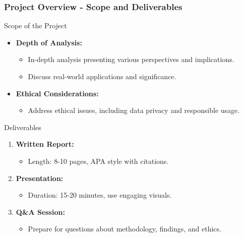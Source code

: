 \documentclass[aspectratio=169]{beamer}
\begin{document}
\begin{frame}[fragile]
    \frametitle{Project Overview - Scope and Deliverables}
    \begin{block}{Scope of the Project}
        \begin{itemize}
            \item \textbf{Depth of Analysis:}
                \begin{itemize}
                    \item In-depth analysis presenting various perspectives and implications.
                    \item Discuss real-world applications and significance.
                \end{itemize}
                
            \item \textbf{Ethical Considerations:}
                \begin{itemize}
                    \item Address ethical issues, including data privacy and responsible usage.
                \end{itemize}
        \end{itemize}
    \end{block}

    \begin{block}{Deliverables}
        \begin{enumerate}
            \item \textbf{Written Report:}
                \begin{itemize}
                    \item Length: 8-10 pages, APA style with citations.
                \end{itemize}
                
            \item \textbf{Presentation:}
                \begin{itemize}
                    \item Duration: 15-20 minutes, use engaging visuals.
                \end{itemize}

            \item \textbf{Q\&A Session:}
                \begin{itemize}
                    \item Prepare for questions about methodology, findings, and ethics.
                \end{itemize}
        \end{enumerate}
    \end{block}
\end{frame}
\end{document}
